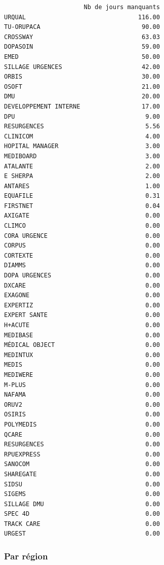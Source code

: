\documentclass[]{article}
\begin{document}
\begin{verbatim}
                      Nb de jours manquants
URQUAL                               116.00
TU-ORUPACA                            90.00
CROSSWAY                              63.03
DOPASOIN                              59.00
EMED                                  50.00
SILLAGE URGENCES                      42.00
ORBIS                                 30.00
OSOFT                                 21.00
DMU                                   20.00
DEVELOPPEMENT INTERNE                 17.00
DPU                                    9.00
RESURGENCES                            5.56
CLINICOM                               4.00
HOPITAL MANAGER                        3.00
MEDIBOARD                              3.00
ATALANTE                               2.00
E SHERPA                               2.00
ANTARES                                1.00
EQUAFILE                               0.31
FIRSTNET                               0.04
AXIGATE                                0.00
CLIMCO                                 0.00
CORA URGENCE                           0.00
CORPUS                                 0.00
CORTEXTE                               0.00
DIAMMS                                 0.00
DOPA URGENCES                          0.00
DXCARE                                 0.00
EXAGONE                                0.00
EXPERTIZ                               0.00
EXPERT SANTE                           0.00
H+ACUTE                                0.00
MEDIBASE                               0.00
MÉDICAL OBJECT                         0.00
MEDINTUX                               0.00
MEDIS                                  0.00
MEDIWERE                               0.00
M-PLUS                                 0.00
NAFAMA                                 0.00
ORUV2                                  0.00
OSIRIS                                 0.00
POLYMEDIS                              0.00
QCARE                                  0.00
RESURGENCES                            0.00
RPUEXPRESS                             0.00
SANOCOM                                0.00
SHAREGATE                              0.00
SIDSU                                  0.00
SIGEMS                                 0.00
SILLAGE DMU                            0.00
SPEC 4D                                0.00
TRACK CARE                             0.00
URGEST                                 0.00
\end{verbatim}

\subsubsection{Par région}\label{par-region}
\end{document}
